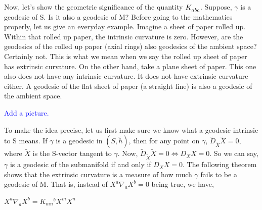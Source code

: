Now, let's show the geometric significance of the quantity $ \tt{K}{}{abc}$. Suppose, $\gamma$ is a geodesic of S. Is it also a geodesic of M? Before going to the mathematics properly, let us give an everyday example. Imagine a sheet of paper rolled up. Within that rolled up paper, the intrinsic curvature is zero. However, are the geodesics of the rolled up paper (axial rings) also geodesics of the ambient space? Certainly not. This is what we mean when we say the rolled up sheet of paper has extrinsic curvature. On the other hand, take a plane sheet of paper. This one also does not have any intrinsic curvature. It does not have extrinsic curvature either. A geodesic of the flat sheet of paper (a straight line) is also a geodesic of the ambient space. 

\textcolor{blue}{Add a picture.}
 

To make the idea precise, let us first make sure we know what a geodesic intrinsic to S means. If $\gamma$ is a geodesic in $(S, \tilde{h})$, then for any point on $\gamma$, $\tilde{D}_{\tilde{X}} \tilde{X} = 0$, where $\tilde{X}$ is the S-vector tangent to $\gamma$. Now, $\tilde{D}_{\tilde{X}} \tilde{X} = 0 \iff D_X X = 0$. So we can say, $\gamma$ is a geodesic of the submanifold if and only if $D_X X = 0$. The following theorem shows that the extrinsic curvature is a measure of how much $\gamma$ fails to be a geodesic of M. That is, instead of $X^a \nabla_a X^b =0 $ being true, we have,


\begin{proposition}
     $X^a \nabla_a X^b = K_{mn}{}^{b} X^m X^n$
\end{proposition}

